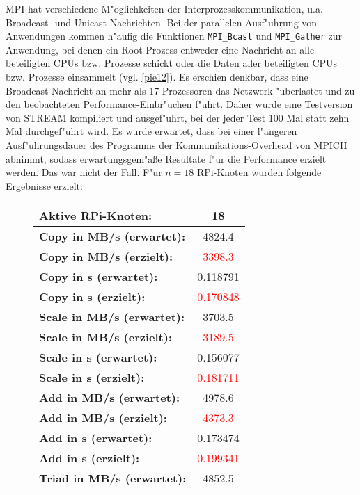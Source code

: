 \begin{enumerate}
MPI hat verschiedene M"oglichkeiten der Interprozesskommunikation, u.a. Broadcast- und Unicast-Nachrichten. Bei der parallelen Ausf"uhrung von Anwendungen kommen h"aufig die Funktionen \texttt{MPI\_Bcast} und \texttt{MPI\_Gather} zur Anwendung, bei denen ein Root-Prozess entweder eine Nachricht an alle beteiligten CPUs bzw. Prozesse schickt oder die Daten aller beteiligten CPUs bzw. Prozesse einsammelt (vgl. \ref{pie12}). Es erschien denkbar, dass eine Broadcast-Nachricht an mehr als 17 Prozessoren das Netzwerk "uberlastet und zu den beobachteten Performance-Einbr"uchen f"uhrt. Daher wurde eine Testversion von STREAM kompiliert und ausgef"uhrt, bei der jeder Test 100 Mal statt zehn Mal durchgef"uhrt wird. Es wurde erwartet, dass bei einer l"angeren Ausf"uhrungsdauer des Programms der Kommunikations-Overhead von MPICH abnimmt, sodass erwartungsgem"a\ss e Resultate f"ur die Performance erzielt werden. Das war nicht der Fall. F"ur $n=18$ RPi-Knoten wurden folgende Ergebnisse erzielt: 
\begin{figure}
  \centering
  \begin{tabular}{|l|c|}
    \hline 
    \textbf{Aktive RPi-Knoten:} & \textbf{18}\\ 
    \hline 
    \textbf{Copy in MB/s (erwartet):} & 4824.4\\
    \hline 
    \textbf{Copy in MB/s (erzielt):} & \textcolor{red}{3398.3}\\
    \hline 
    \textbf{Copy in s (erwartet):} & 0.118791\\
    \hline 
    \textbf{Copy in s (erzielt):} & \textcolor{red}{0.170848}\\
    \hline 
    \textbf{Scale in MB/s (erwartet):} & 3703.5\\
    \hline 
    \textbf{Scale in MB/s (erzielt):} & \textcolor{red}{3189.5}\\
    \hline 
	\textbf{Scale in s (erwartet):} & 0.156077\\
    \hline 
    \textbf{Scale in s (erzielt):} & \textcolor{red}{0.181711}\\
    \hline 
    \textbf{Add in MB/s (erwartet):} & 4978.6\\
    \hline 
    \textbf{Add in MB/s (erzielt):}& \textcolor{red}{4373.3}\\
    \hline 
    \textbf{Add in s (erwartet):} & 0.173474\\
    \hline 
    \textbf{Add in s (erzielt):} & \textcolor{red}{0.199341}\\
    \hline 
    \textbf{Triad in MB/s (erwartet):} & 4852.5\\

\end{tabular}
\end{figure}
\end{enumerate}
